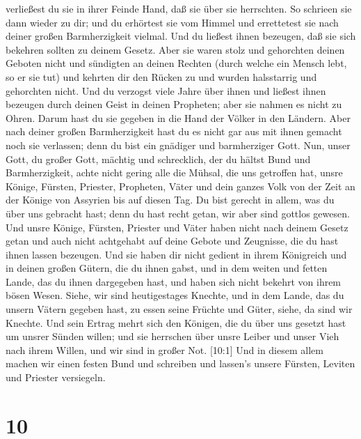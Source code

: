 verließest du sie in ihrer Feinde Hand, daß sie über sie herrschten. So
schrieen sie dann wieder zu dir; und du erhörtest sie vom Himmel und
errettetest sie nach deiner großen Barmherzigkeit vielmal. 
Und du ließest ihnen bezeugen, daß sie sich bekehren sollten zu deinem
Gesetz. Aber sie waren stolz und gehorchten deinen Geboten nicht und
sündigten an deinen Rechten (durch welche ein Mensch lebt, so er sie
tut) und kehrten dir den Rücken zu und wurden halsstarrig und gehorchten
nicht.  Und du verzogst viele Jahre über ihnen und ließest
ihnen bezeugen durch deinen Geist in deinen Propheten; aber sie nahmen
es nicht zu Ohren. Darum hast du sie gegeben in die Hand der Völker in
den Ländern.  Aber nach deiner großen Barmherzigkeit hast
du es nicht gar aus mit ihnen gemacht noch sie verlassen; denn du bist
ein gnädiger und barmherziger Gott.  Nun, unser Gott, du
großer Gott, mächtig und schrecklich, der du hältst Bund und
Barmherzigkeit, achte nicht gering alle die Mühsal, die uns getroffen
hat, unsre Könige, Fürsten, Priester, Propheten, Väter und dein ganzes
Volk von der Zeit an der Könige von Assyrien bis auf diesen Tag.
 Du bist gerecht in allem, was du über uns gebracht hast;
denn du hast recht getan, wir aber sind gottlos gewesen. 
Und unsre Könige, Fürsten, Priester und Väter haben nicht nach deinem
Gesetz getan und auch nicht achtgehabt auf deine Gebote und Zeugnisse,
die du hast ihnen lassen bezeugen.  Und sie haben dir nicht
gedient in ihrem Königreich und in deinen großen Gütern, die du ihnen
gabst, und in dem weiten und fetten Lande, das du ihnen dargegeben hast,
und haben sich nicht bekehrt von ihrem bösen Wesen.  Siehe,
wir sind heutigestages Knechte, und in dem Lande, das du unsern Vätern
gegeben hast, zu essen seine Früchte und Güter, siehe, da sind wir
Knechte.  Und sein Ertrag mehrt sich den Königen, die du
über uns gesetzt hast um unsrer Sünden willen; und sie herrschen über
unsre Leiber und unser Vieh nach ihrem Willen, und wir sind in großer
Not.  {[}10:1{]} Und in diesem allem machen wir einen
festen Bund und schreiben und lassen's unsere Fürsten, Leviten und
Priester versiegeln.

\hypertarget{section-9}{%
\section{10}\label{section-9}}

